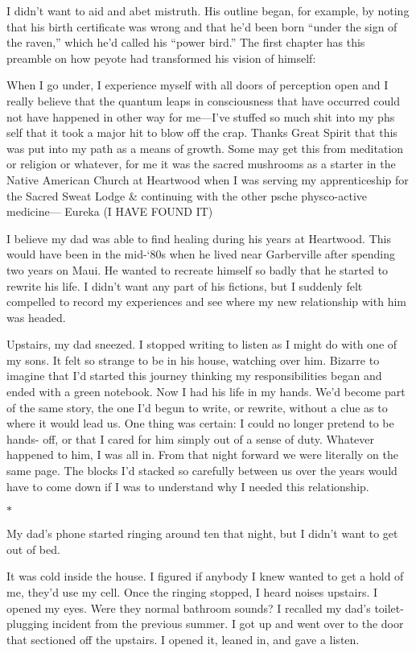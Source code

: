 \documentclass[12pt]{book}
\begin{document}
I didn't want to aid and abet mistruth. His outline began, for example, by noting that his birth certificate was wrong and that he'd been born ``under the sign of the raven,'' which he'd called his ``power bird.'' The first chapter has this preamble on how peyote had transformed his vision of himself:

When I go under, I experience myself with all doors of perception open and I really believe that the quantum leaps in consciousness that have occurred could not have happened in other way for me---I've stuffed so much shit into my phs self that it took a major hit to blow off the crap. Thanks Great Spirit that this was put into my path as a means of growth. Some may get this from meditation or religion or whatever, for me it was the sacred mushrooms as a starter in the Native American Church at Heartwood when I was serving my apprenticeship for the Sacred Sweat Lodge \& continuing with the other psche physco-active medicine--- Eureka (I HAVE FOUND IT)

I believe my dad was able to find healing during his years at Heartwood. This would have been in the mid-`80s when he lived near Garberville after spending two years on Maui. He wanted to recreate himself so badly that he started to rewrite his life. I didn't want any part of his fictions, but I suddenly felt compelled to record my experiences and see where my new relationship with him was headed.

Upstairs, my dad sneezed. I stopped writing to listen as I might do with one of my sons. It felt so strange to be in his house, watching over him. Bizarre to imagine that I'd started this journey thinking my responsibilities began and ended with a green notebook. Now I had his life in my hands. We'd become part of the same story, the one I'd begun to write, or rewrite, without a clue as to where it would lead us. One thing was certain: I could no longer pretend to be hands- off, or that I cared for him simply out of a sense of duty. Whatever happened to him, I was all in. From that night forward we were literally on the same page. The blocks I'd stacked so carefully between us over the years would have to come down if I was to understand why I needed this relationship.

\begin{center}$*$\end{center}

My dad's phone started ringing around ten that night, but I didn't want to get out of bed.

It was cold inside the house. I figured if anybody I knew wanted to get a hold of me, they'd use my cell. Once the ringing stopped, I heard noises upstairs. I opened my eyes. Were they normal bathroom sounds? I recalled my dad's toilet-plugging incident from the previous summer. I got up and went over to the door that sectioned off the upstairs. I opened it, leaned in, and gave a listen.
\end{document}
